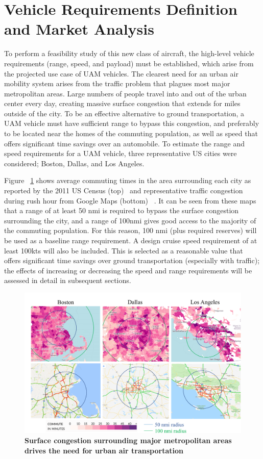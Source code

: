 \documentclass[]{aiaa-tc}%
\begin{document}
\section{Vehicle Requirements Definition and Market Analysis}
To perform a feasibility study of this new class of aircraft, the high-level vehicle requirements (range, speed, and payload) must be established, which arise from the projected use case of UAM vehicles.  The clearest need for an urban air mobility system arises from the traffic problem that plagues most major metropolitan areas.  Large numbers of people travel into and out of the urban center every day, creating massive surface congestion that extends for miles outside of the city.  To be an effective alternative to ground transportation, a UAM vehicle must have sufficient range to bypass this congestion, and preferably to be located near the homes of the commuting population, as well as speed that offers significant time savings over an automobile.  
To estimate the range and speed requirements for a UAM vehicle, three representative US cities were considered; Boston, Dallas, and Los Angeles.  

Figure ~\ref{f:commute} shows average commuting times in the area surrounding each city as reported by the 2011 US Census (top) ~\cite{WNYC}and representative traffic congestion during rush hour from Google Maps (bottom) ~\cite{GMaps}.   It can be seen from these maps that a range of at least 50 nmi is required to bypass the surface congestion surrounding the city, and a range of 100nmi gives good access to the majority of the commuting population.   For this reason, 100 nmi (plus required reserves) will be used as a baseline range requirement.  A design cruise speed requirement of at least 100kts will also be included.  This is selected as a reasonable value that offers significant time savings over ground transportation (especially with traffic); the effects of increasing or decreasing the speed and range requirements will be assessed in detail in subsequent sections.  

\begin{figure}[h!]
	\begin{center}
	\includegraphics[width=1.0\textwidth]{commuting_need.pdf}
    \caption{\textbf{Surface congestion surrounding major metropolitan areas drives the need for urban air transportation}}
	\label{f:commute}
	\end{center}
\end{figure}
\end{document}
